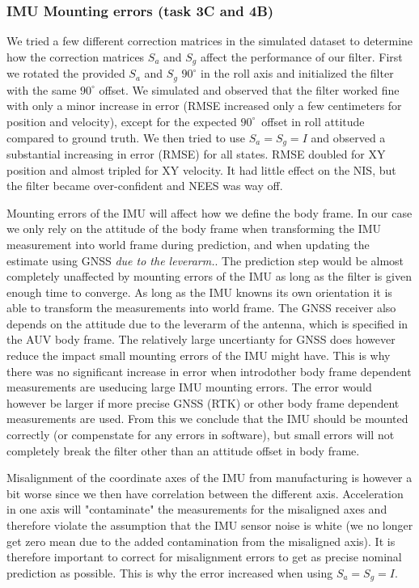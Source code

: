 \subsubsection{IMU Mounting errors (task 3C and 4B)}
We tried a few different correction matrices  in the simulated dataset to determine how the correction matrices $S_a$ and $S_g$ affect the performance of our filter. First we rotated the provided $S_a$ and $S_g$ $90^\circ$ in the roll axis and initialized the filter with the same $90^\circ$ offset. We simulated and observed that the filter worked fine with only a minor increase in error (RMSE increased only a few centimeters for position and velocity), except for the expected $90^\circ$ offset in roll attitude compared to ground truth. We then tried to use $S_a = S_g = I$ and observed a substantial increasing in error (RMSE) for all states. RMSE doubled for XY position and almost tripled for XY velocity. It had little effect on the NIS, but the filter became over-confident and NEES was way off.

Mounting errors of the IMU will affect how we define the body frame. In our case we only rely on the attitude of the body frame when transforming the IMU measurement into world frame during prediction, and when updating the estimate using GNSS \textit{due to the leverarm.}. The prediction step would be almost completely unaffected by mounting errors of the IMU as long as the filter is given enough time to converge. As long as the IMU knowns its own orientation it is able to transform the measurements into world frame. The GNSS receiver also depends on the attitude due to the leverarm of the antenna, which is specified in the AUV body frame. The relatively large uncertianty for GNSS does however reduce the impact small mounting errors of the IMU might have. This is why there was no significant increase in error when introdother body frame dependent measurements are useducing large IMU mounting errors. The error would however be larger if more precise GNSS (RTK) or other body frame dependent measurements are used. From this we conclude that the IMU should be mounted correctly (or compenstate for any errors in software), but small errors will not completely break the filter other than an attitude offset in body frame. 

Misalignment of the coordinate axes of the IMU from manufacturing is however a bit worse since we then have correlation between the different axis. Acceleration in one axis will "contaminate" the measurements for the misaligned axes and therefore violate the assumption that the IMU sensor noise is white (we no longer get zero mean due to the added contamination from the misaligned axis). It is therefore important to correct for misalignment errors to get as precise nominal prediction as possible. This is why the error increased when using $S_a = S_g = I$.

